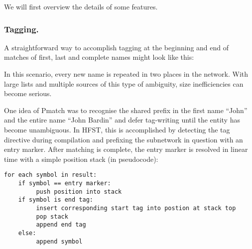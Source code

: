 \documentclass{llncs}
\begin{document}
We will first overview the details of some features.

\subsubsection{Tagging.}
A straightforward way to accomplish tagging at the beginning and end of matches
of first, last and complete names might look like this:


In this scenario, every new name is repeated in two places in the network. With
large lists and multiple sources of this type of ambiguity, size inefficiencies
can become serious.

One idea of Pmatch was to recognise the shared prefix in the first name ``John''
and the entire name ``John Bardin'' and defer tag-writing until the entity
has become unambiguous. In HFST, this is accomplished by detecting the tag directive
during compilation and prefixing the subnetwork in question with an entry marker.
After matching is complete, the entry marker is resolved in linear time with
a simple position stack (in pseudocode):

\begin{verbatim}
for each symbol in result:
    if symbol == entry marker:
         push position into stack
    if symbol is end tag:
         insert corresponding start tag into postion at stack top
         pop stack
         append end tag
    else:
         append symbol
\end{verbatim}
\end{document}
